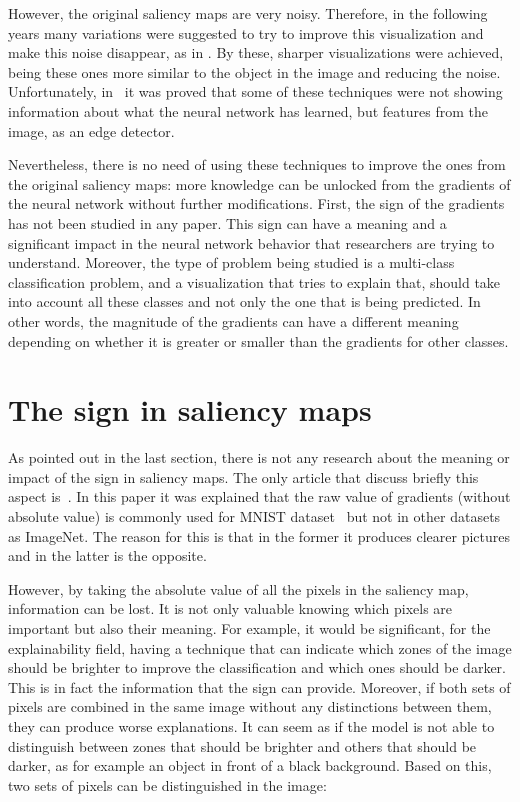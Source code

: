\documentclass[preprint,12pt]{elsarticle}
\begin{document}
However, the original saliency maps are very noisy. Therefore, in the following years many variations were suggested to try to improve this visualization and make this noise disappear, as in \cite{Springenberg2015, Sundararajan2017, Shrikumar2017}. By these, sharper visualizations were achieved, being these ones more similar to the object in the image and reducing the noise. Unfortunately, in~\cite{Adebayo2018} it was proved that some of these techniques were not showing information about what the neural network has learned, but features from the image, as an edge detector. 

Nevertheless, there is no need of using these techniques to improve the ones from the original saliency maps: more knowledge can be unlocked from the gradients of the neural network without further modifications. First, the sign of the gradients has not been studied in any paper. This sign can have a meaning and a significant impact in the neural network behavior that researchers are trying to understand. Moreover, the type of problem being studied is a multi-class classification problem, and a visualization that tries to explain that, should take into account all these classes and not only the one that is being predicted. In other words, the magnitude of the gradients can have a different meaning depending on whether it is greater or smaller than the gradients for other classes. 

\section{The sign in saliency maps}
\label{sec:the sign in saliency maps}
As pointed out in the last section, there is not any research about the meaning or impact of the sign in saliency maps. The only article that discuss briefly this aspect is~\cite{Smilkov2017}. In this paper it was explained that the raw value of gradients (without absolute value) is commonly used for MNIST dataset~\cite{MNISTHandwrittenDigit} but not in other datasets as ImageNet. The reason for this is that in the former it produces clearer pictures and in the latter is the opposite. 

However, by taking the absolute value of all the pixels in the saliency map, information can be lost. It is not only valuable knowing which pixels are important but also their meaning. For example, it would be significant, for the explainability field, having a technique that can indicate which zones of the image should be brighter to improve the classification and which ones should be darker. This is in fact the information that the sign can provide. Moreover, if both sets of pixels are combined in the same image without any distinctions between them, they can produce worse explanations. It can seem as if the model is not able to distinguish between zones that should be brighter and others that should be darker, as for example an object in front of a black background. Based on this, two sets of pixels can be distinguished in the image:
\end{document}
